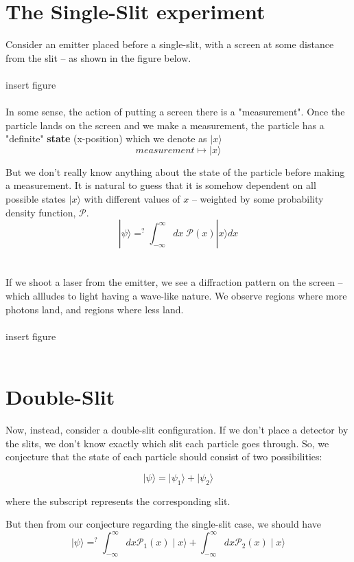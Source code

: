 \documentclass[twoside]{article}
\newcommand{\ket}[1]{|#1 \rangle}
\begin{document}
\section{The Single-Slit experiment}
Consider an emitter placed before a single-slit, with a screen at some distance from the slit -- as shown in the figure below.
\\\
\\
insert figure
\\
\\
In some sense, the action of putting a screen there is a "measurement". Once the particle lands on the screen and we make a measurement, the particle has a "definite" \textbf{state} (x-position) which we denote as $\ket{x}$
\[measurement \mapsto \mid x \rangle \] 

But we don't really know anything about the state of the particle before making a measurement. It is natural to guess that it is somehow dependent on all possible states $\ket{x}$ with different values of $x$ -- weighted by some probability density function, $\mathcal{P}$.
\[ \ket{\psi} =^{?} \int_{-\infty}^{\infty} dx\; \mathcal{P}(x) \ket{x} dx \]
\\
\\
If we shoot a laser from the emitter, we see a diffraction pattern on the screen -- which allludes to light having a wave-like nature. We observe regions where more photons land, and regions where less land.
\\
\\
insert figure
\\
\\

\section{Double-Slit}
Now, instead, consider a double-slit configuration. If we don't place a detector by the slits, we don't know exactly which slit each particle goes through. So, we conjecture that the state of each particle should consist of two possibilities:

\[ \mid \psi \rangle = \mid\psi_1 \rangle + \mid \psi_2 \rangle \] 

where the subscript represents the corresponding slit.

But then from our conjecture regarding the single-slit case, we should have
\[\mid \psi \rangle =^{?} \int_{-\infty}^{\infty} dx \mathcal{P}_1(x)\mid x \rangle +\int_{-\infty}^{\infty} dx \mathcal{P}_2(x)\mid x \rangle \]
\end{document}
